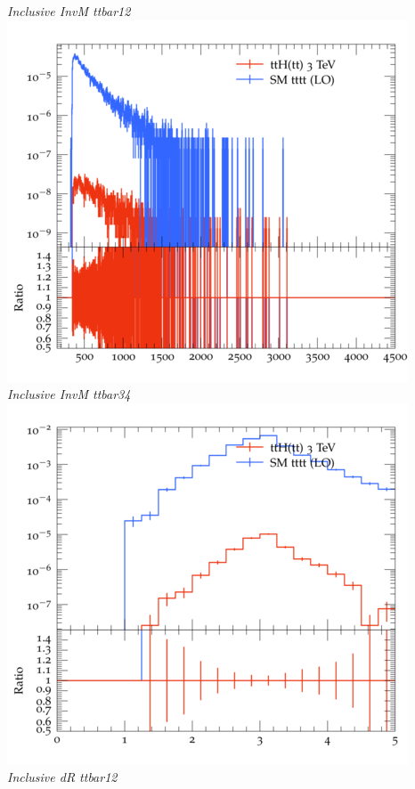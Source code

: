\documentclass{beamer}
\begin{document}
\begin{frame}
\begin{columns}
\textit{\small Inclusive InvM ttbar12}
\includegraphics[width=\textwidth]{../plots/ttH_3000/tttt_ttH/Inclusive_InvM_ttbar34.png}\\
\textit{\small Inclusive InvM ttbar34}
\includegraphics[width=\textwidth]{../plots/ttH_3000/tttt_ttH/Inclusive_dR_ttbar12.png}\\
\textit{\small Inclusive dR ttbar12}
\end{columns}
\end{frame}
\end{document}
